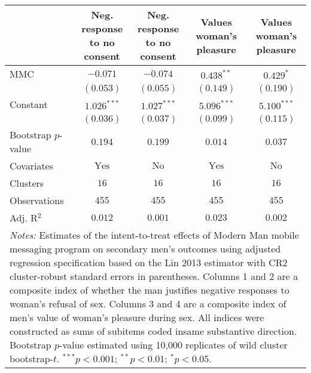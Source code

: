 
\begin{tabular}{l c c c c}
\toprule
 & \shortstack{Neg. response \\ to no consent} & \shortstack{Neg. response \\ to no consent} & Values woman's pleasure & Values woman's pleasure \\
\midrule
MMC                 & $-0.071$       & $-0.074$      & $0.438^{**}$   & $0.429^{*}$   \\
                    & $(0.053)$      & $(0.055)$     & $(0.149)$      & $(0.190)$     \\
Constant            & $1.026^{***}$  & $1.027^{***}$ & $5.096^{***}$  & $5.100^{***}$ \\
                    & $(0.036)$      & $(0.037)$     & $(0.099)$      & $(0.115)$     \\
\midrule
Bootstrap $p$-value & $0.194$        & $0.199$       & $0.014$        & $0.037$       \\
Covariates          & $\textrm{Yes}$ & $\textrm{No}$ & $\textrm{Yes}$ & $\textrm{No}$ \\
Clusters            & $16$           & $16$          & $16$           & $16$          \\
Observations        & $455$          & $455$         & $455$          & $455$         \\
Adj. R$^2$          & $0.012$        & $0.001$       & $0.023$        & $0.002$       \\
\bottomrule
\multicolumn{5}{l}{\scriptsize{\parbox{\linewidth}{\vspace{2pt}
       \textit{Notes:} Estimates of the intent-to-treat effects of Modern Man mobile
       messaging program on secondary men's outcomes using adjusted regression
       specification based on the Lin 2013 estimator with CR2 cluster-robust
       standard errors in parentheses. Columns 1 and 2 are a composite index of
       whether the man justifies negative responses to woman's refusal of sex. Columns 3 and 4
       are a composite index of men's value of woman's pleasure during sex. All indices were
       constructed as sums of subitems coded insame substantive direction. 
       Bootstrap $p$-value estimated using 10,000 replicates of wild cluster bootstrap-$t$. \\ $^{***}p<0.001$; $^{**}p<0.01$; $^{*}p<0.05$.}}}
\end{tabular}
